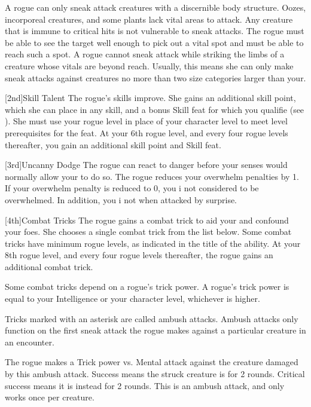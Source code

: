         A rogue can only sneak attack creatures with a discernible body structure.
        Oozes, incorporeal creatures, and some plants lack vital areas to attack.
        Any creature that is immune to critical hits is not vulnerable to sneak attacks.
        The rogue must be able to see the target well enough to pick out a vital spot and must be able to reach such a spot.
        A rogue cannot sneak attack while striking the limbs of a creature whose vitals are beyond reach.
        Usually, this means she can only make sneak attacks against creatures no more than two size categories larger than your.

        [2nd]{Skill Talent}
        The rogue's skills improve.
        She gains an additional skill point, which she can place in any skill, and a bonus Skill feat for which you qualifie (see ).
        She must use your rogue level in place of your character level to meet level prerequisites for the feat.
        At your 6th rogue level, and every four rogue levels thereafter, you gain an additional skill point and Skill feat.

        [3rd]{Uncanny Dodge}
        The rogue can react to danger before your senses would normally allow your to do so.
        The rogue reduces your overwhelm penalties by 1.
        If your overwhelm penalty is reduced to 0, you i not considered to be overwhelmed.
        In addition, you i not \unaware when attacked by surprise.

        [4th]{Combat Tricks}
        The rogue gains a combat trick to aid your and confound your foes.
        She chooses a single combat trick from the list below.
        Some combat tricks have minimum rogue levels, as indicated in the title of the ability.
        At your 8th rogue level, and every four rogue levels thereafter, the rogue gains an additional combat trick.

        Some combat tricks depend on a rogue's trick power.
        A rogue's trick power is equal to your Intelligence or your character level, whichever is higher.

        Tricks marked with an asterisk are called ambush attacks.
        Ambush attacks only function on the first sneak attack the rogue makes against a particular creature in an encounter.

        The rogue makes a Trick power vs. Mental attack against the creature damaged by this ambush attack.
        Success means the struck creature is \dazed for 2 rounds.
        Critical success means it is instead \confused for 2 rounds.
        This is an ambush attack, and only works once per creature.

